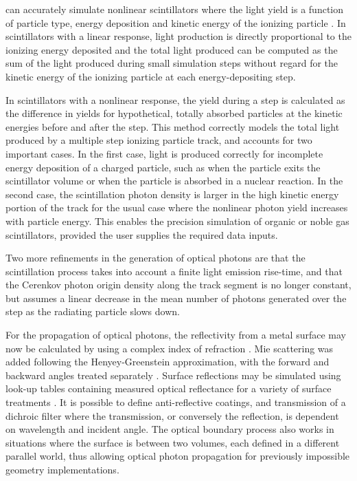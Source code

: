 \Gfour{} can accurately simulate nonlinear scintillators where the light yield is
a function of particle type, energy deposition and kinetic energy of the 
ionizing particle \cite{em:opt1}.  In scintillators with a linear response, 
light production is directly proportional to the ionizing energy deposited and
the total light produced can be computed as the sum of the light produced during
small simulation steps without regard for the kinetic energy of the ionizing 
particle at each energy-depositing step.

In scintillators with a nonlinear response, the yield during a step is
calculated as the difference in yields for hypothetical, totally absorbed 
particles at the kinetic energies before and after the step.  This method 
correctly models the total light produced by a multiple step ionizing particle 
track, and accounts for two important cases.  In the first case, light is 
produced correctly for incomplete energy deposition of a charged particle, such
as when the particle exits the scintillator volume or when the particle is 
absorbed in a nuclear reaction.  In the second case, the scintillation photon 
density is larger in the high kinetic energy portion of the track for the usual
case where the nonlinear photon yield increases with particle energy.  This 
enables the precision simulation of organic or noble gas scintillators, provided
the user supplies the required data inputs.

Two more refinements in the generation of optical photons are that the 
scintillation process takes into account a finite light emission rise-time, 
and that the Cerenkov photon origin density along the track segment is no longer 
constant, but assumes a linear decrease in the mean number of photons generated 
over the step as the radiating particle slows down.

For the propagation of optical photons, the reflectivity from a metal surface
may now be calculated by using a complex index of refraction \cite{embib:Iowa}.
Mie scattering was added following the \mbox{Henyey-Greenstein} approximation, 
with the forward and backward angles treated separately \cite{embib:Mie}.
Surface reflections may be simulated using look-up tables containing measured
optical reflectance for a variety of surface treatments \cite{em:opt2}. It is 
possible to define anti-reflective coatings, and transmission of a dichroic 
filter where the transmission, or conversely the reflection, is dependent on 
wavelength and incident angle.  The optical boundary process also works in 
situations where the surface is between two volumes, each defined in a different
parallel world, thus allowing optical photon propagation for previously 
impossible geometry implementations.

